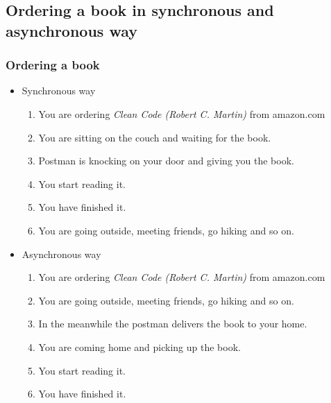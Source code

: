 \documentclass[11pt,t,usepdftitle=false,aspectratio=169,usenames,dvipsnames]{beamer}
\begin{document}
    \subsection{Ordering a book in synchronous and asynchronous way}
    \begin{frame}
        \frametitle{Ordering a book}
        \begin{itemize}
            \item<1-> Synchronous way
            \begin{enumerate}
                \item<2-> You are ordering \textit{Clean Code (Robert C. Martin)} from amazon.com
                \item<3-> You are sitting on the couch and waiting for the book.
                \item<4-> Postman is knocking on your door and giving you the book.
                \item<5-> You start reading it.
                \item<6-> You have finished it.
                \item<7-> You are going outside, meeting friends, go hiking and so on.
            \end{enumerate}
            \item<8-> Asynchronous way
            \begin{enumerate}
                \item<9-> You are ordering \textit{Clean Code (Robert C. Martin)} from amazon.com
                \item<10-> You are going outside, meeting friends, go hiking and so on.
                \item<11-> In the meanwhile the postman delivers the book to your home.
                \item<12-> You are coming home and picking up the book.
                \item<13-> You start reading it.
                \item<14-> You have finished it.
            \end{enumerate}
        \end{itemize}
    \end{frame}
\end{document}
